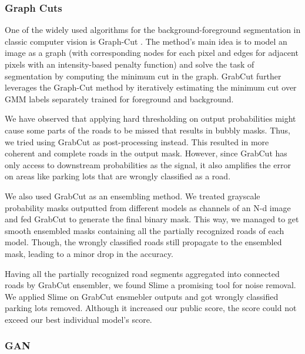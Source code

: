     
    \subsubsection{Graph Cuts}
    One of the widely used algorithms for the background-foreground segmentation in classic computer vision is Graph-Cut \cite{graphcut}. 
The method's main idea is to model an image as a graph (with corresponding nodes for each pixel and edges for adjacent pixels with an intensity-based penalty function) and solve the task of segmentation by computing the minimum cut in the graph.
GrabCut \cite{grabcut} further leverages the Graph-Cut method by iteratively estimating the minimum cut over GMM labels separately trained for foreground and background.

We have observed that applying hard thresholding on output probabilities might cause some parts of the roads to be missed that results in bubbly masks. Thus, we tried using GrabCut as post-processing instead. This resulted in more coherent and complete roads in the output mask. However, since GrabCut has only access to downstream probabilities as the signal, it also amplifies the error on areas like parking lots that are wrongly classified as a road.

We also used GrabCut as an ensembling method. We treated grayscale probability masks outputted from different models as channels of an N-d image and fed GrabCut to generate the final binary mask. This way, we managed to get smooth ensembled masks containing all the partially recognized roads of each model. Though, the wrongly classified roads still propagate to the ensembled mask, leading to a minor drop in the accuracy.

Having all the partially recognized road segments aggregated into connected roads by GrabCut ensembler, we found Slime a promising tool for noise removal. We applied Slime on GrabCut ensmebler outputs and got wrongly classified parking lots removed. Although it increased our public score, the score could not exceed our best individual model's score.

    \subsubsection{GAN}
    
